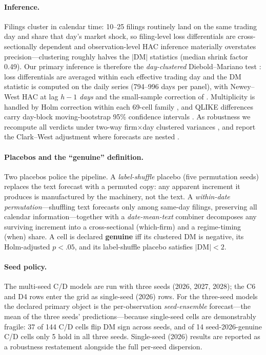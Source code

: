 \paragraph{Inference.}
Filings cluster in calendar time: 10--25 filings routinely land on the same trading day and share that day's market shock, so filing-level loss differentials are cross-sectionally dependent and observation-level HAC inference materially overstates precision---clustering roughly halves the $|\mathrm{DM}|$ statistics (median shrink factor 0.49). Our primary inference is therefore the \emph{day-clustered} Diebold--Mariano test \citep{diebold1995comparing}: loss differentials are averaged within each effective trading day and the DM statistic is computed on the daily series (794--996 days per panel), with Newey--West HAC at lag $h-1$ \emph{days} and the small-sample correction of \citet{harvey1997testing}. Multiplicity is handled by Holm correction within each 69-cell family \citep{holm1979simple}, and QLIKE differences carry day-block moving-bootstrap 95\% confidence intervals \citep{politis1994stationary}. As robustness we recompute all verdicts under two-way firm$\times$day clustered variances \citep{cameron2011twoway}, and report the Clark--West adjustment where forecasts are nested \citep{clarkwest2007}.

\paragraph{Placebos and the ``genuine'' definition.}
Two placebos police the pipeline. A \emph{label-shuffle} placebo (five permutation seeds) replaces the text forecast with a permuted copy: any apparent increment it produces is manufactured by the machinery, not the text. A \emph{within-date permutation}---shuffling text forecasts only among same-day filings, preserving all calendar information---together with a \emph{date-mean-text} combiner decomposes any surviving increment into a cross-sectional (which-firm) and a regime-timing (when) share. A cell is declared \textbf{genuine} iff its clustered DM is negative, its Holm-adjusted $p<.05$, and its label-shuffle placebo satisfies $|\mathrm{DM}|<2$.

\paragraph{Seed policy.}
The multi-seed C/D models are run with three seeds (2026, 2027, 2028); the C6 and D4 rows enter the grid as single-seed (2026) rows. For the three-seed models the declared primary object is the per-observation \emph{seed-ensemble} forecast---the mean of the three seeds' predictions---because single-seed cells are demonstrably fragile: 37 of 144 C/D cells flip DM sign across seeds, and of 14 seed-2026-genuine C/D cells only 5 hold in all three seeds. Single-seed (2026) results are reported as a robustness restatement alongside the full per-seed dispersion.

